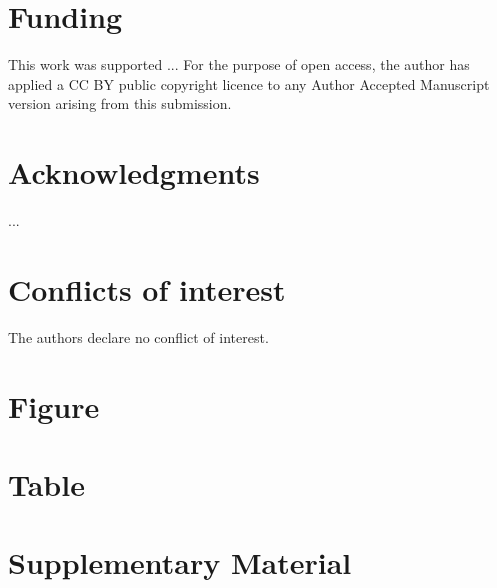 \documentclass[fleqn,10pt,lineno]{manuscript}
\newcommand{\beginsupplement}{%
        \setcounter{table}{0}
        \renewcommand{\thetable}{S\arabic{table}}%
        \setcounter{figure}{0}
        \renewcommand{\thefigure}{S\arabic{figure}}%
     }
\begin{document}
\section*{Funding}
This work was supported ... For the purpose of open access, the author has applied a CC BY public copyright licence to any Author Accepted Manuscript version arising from this submission.

\section*{Acknowledgments}
...

\section*{Conflicts of interest}
The authors declare no conflict of interest.





\section*{Figure}


\section*{Table}


\clearpage

\beginsupplement
\renewcommand\figurename{Supplementary Figure}
\renewcommand\tablename{Supplementary Table}


\section*{Supplementary Material}
\end{document}
